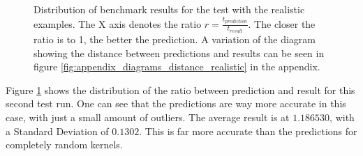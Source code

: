 \begin{figure}[p]
	\begin{center}
	\end{center}
	\caption{Distribution of benchmark results for the test with the realistic examples. The X axis denotes the ratio $r = \frac{t_{prediction}}{t_{result}}$. The closer the ratio is to 1, the better the prediction.  A variation of the diagram showing the distance between predictions and results can be seen in figure \ref{fig:appendix_diagrams_distance_realistic} in the appendix.}
	\label{fig:results_distribution_realistic}
\end{figure}

Figure \ref{fig:results_distribution_realistic} shows the distribution of the ratio between prediction and result for this second test run. One can see that the predictions are way more accurate in this case, with just a small amount of outliers. The average result is at $1.186530$, with a Standard Deviation of $0.1302$. This is far more accurate than the predictions for completely random kernels. 